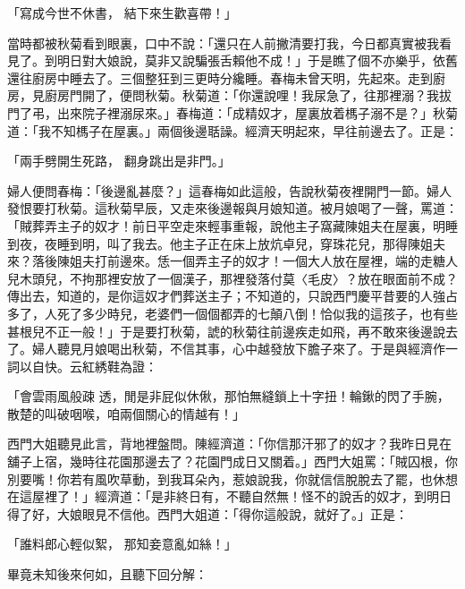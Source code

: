 「寫成今世不休書，  結下來生歡喜帶！」

當時都被秋菊看到眼裏，口中不說：「還只在人前撇清要打我，今日都真實被我看見了。到明日對大娘說，莫非又說騙張舌賴他不成！」于是瞧了個不亦樂乎，依舊還往廚房中睡去了。三個整狂到三更時分纔睡。春梅未曾天明，先起來。走到廚房，見廚房門開了，便問秋菊。秋菊道：「你還說哩！我尿急了，往那裡溺？我拔門了弔，出來院子裡溺尿來。」春梅道：「成精奴才，屋裏放着榪子溺不是？」秋菊道：「我不知榪子在屋裏。」兩個後邊聒譟。經濟天明起來，早往前邊去了。正是：

「兩手劈開生死路，  翻身跳出是非門。」

婦人便問春梅：「後邊亂甚麼？」這春梅如此這般，告說秋菊夜裡開門一節。婦人發恨要打秋菊。這秋菊早辰，又走來後邊報與月娘知道。被月娘喝了一聲，罵道：「賊葬弄主子的奴才！前日平空走來輕事重報，說他主子窩藏陳姐夫在屋裏，明睡到夜，夜睡到明，叫了我去。他主子正在床上放炕卓兒，穿珠花兒，那得陳姐夫來？落後陳姐夫打前邊來。恁一個弄主子的奴才！一個大人放在屋裡，端的走糖人兒木頭兒，不拘那裡安放了一個漢子，那裡發落付莫〈毛皮〉？放在眼面前不成？傳出去，知道的，是你這奴才們葬送主子；不知道的，只說西門慶平昔要的人強占多了，人死了多少時兒，老婆們一個個都弄的七顛八倒！恰似我的這孩子，也有些甚根兒不正一般！」于是要打秋菊，諕的秋菊往前邊疾走如飛，再不敢來後邊說去了。婦人聽見月娘喝出秋菊，不信其事，心中越發放下膽子來了。于是與經濟作一詞以自快。云紅綉鞋為證：

「會雲雨風般疎 透，閒是非屁似休偢，那怕無縫鎖上十字扭！輪鍬的閃了手腕，散楚的叫破咽喉，咱兩個關心的情越有！」

西門大姐聽見此言，背地裡盤問。陳經濟道：「你信那汗邪了的奴才？我昨日見在舖子上宿，幾時往花園那邊去了？花園門成日又關着。」西門大姐罵：「賊囚根，你別要嘴！你若有風吹草動，到我耳朵內，惹娘說我，你就信信脫脫去了罷，也休想在這屋裡了！」經濟道：「是非終日有，不聽自然無！怪不的說舌的奴才，到明日得了好，大娘眼見不信他。西門大姐道：「得你這般說，就好了。」正是：

「誰料郎心輕似絮，  那知妾意亂如絲！」

畢竟未知後來何如，且聽下回分解：

